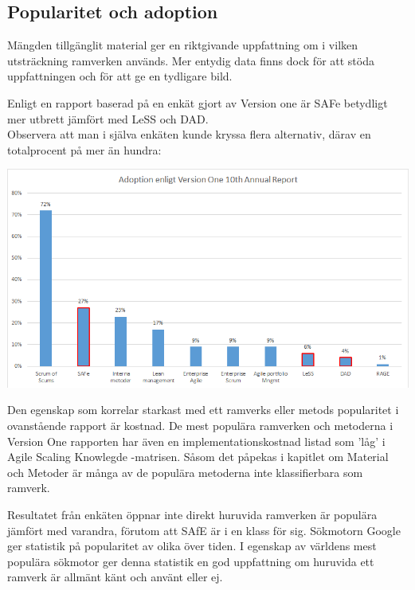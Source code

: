 	\subsection{Popularitet och adoption}
	
		Mängden tillgänglit material ger en riktgivande uppfattning om i vilken utsträckning ramverken används. Mer entydig data finns dock för att stöda uppfattningen och för att ge en tydligare bild.
		
		Enligt en rapport baserad på en enkät gjort av Version one är SAFe betydligt mer utbrett jämfört med LeSS och DAD. \cite{version_one_report} \\	
		
		Observera att man i själva enkäten kunde kryssa flera alternativ, därav en totalprocent på mer än hundra:
		
		\begin{center}
			\includegraphics{Grafer/AnnualReport_Adoption.png}
		\end{center}
		\cite{version_one_report}
	
		Den egenskap som korrelar starkast med ett ramverks eller metods popularitet i ovanstående rapport är kostnad. De mest populära ramverken och metoderna i Version One rapporten har även en implementationskostnad listad som 'låg' i Agile Scaling Knowlegde -matrisen. \cite{ask_matrix}				
		Såsom det påpekas i kapitlet om Material och Metoder är många av de populära metoderna inte klassifierbara som ramverk. 
		
		
		Resultatet från enkäten öppnar inte direkt huruvida ramverken är populära jämfört med varandra, förutom att SAfE är i en klass för sig. Sökmotorn Google ger statistik på popularitet av olika över tiden. I egenskap av världens mest populära sökmotor ger denna statistik en god uppfattning om huruvida ett ramverk är allmänt känt och använt eller ej. 
		
